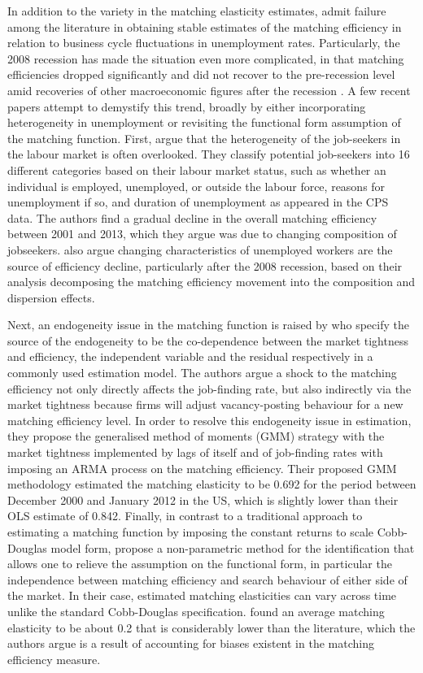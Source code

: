 \documentclass[a4paper, 11pt, tikz]{article}
\begin{document}
In addition to the variety in the matching elasticity estimates, \cite{petrongolo2001looking} admit failure among the literature in obtaining stable estimates of the matching efficiency in relation to business cycle fluctuations in unemployment rates.
Particularly, the 2008 recession has made the situation even more complicated, in that matching efficiencies dropped significantly and did not recover to the pre-recession level amid recoveries of other macroeconomic figures after the recession \citep{barnichon2015labor}.
A few recent papers attempt to demystify this trend, broadly by either incorporating heterogeneity in unemployment or revisiting the functional form assumption of the matching function.
First, \cite{hall2018measuring} argue that the heterogeneity of the job-seekers in the labour market is often overlooked.
They classify potential job-seekers into 16 different categories based on their labour market status, such as whether an individual is employed, unemployed, or outside the labour force, reasons for unemployment if so, and duration of unemployment as appeared in the CPS data.
The authors find a gradual decline in the overall matching efficiency between 2001 and 2013, which they argue was due to changing composition of jobseekers.
\cite{barnichon2015labor} also argue changing characteristics of unemployed workers are the source of efficiency decline, particularly after the 2008 recession, based on their analysis decomposing the matching efficiency movement into the composition and dispersion effects.

Next, an endogeneity issue in the matching function is raised by \cite{borowczyk-martins2013accounting} who specify the source of the endogeneity to be the co-dependence between the market tightness and efficiency, the independent variable and the residual respectively in a commonly used estimation model.
The authors argue a shock to the matching efficiency not only directly affects the job-finding rate, but also indirectly via the market tightness because firms will adjust vacancy-posting behaviour for a new matching efficiency level.
In order to resolve this endogeneity issue in estimation, they propose the generalised method of moments (GMM) strategy with the market tightness implemented by lags of itself and of job-finding rates with imposing an ARMA process on the matching efficiency.
Their proposed GMM methodology estimated the matching elasticity to be 0.692 for the period between December 2000 and January 2012 in the US, which is slightly lower than their OLS estimate of 0.842.
Finally, in contrast to a traditional approach to estimating a matching function by imposing the constant returns to scale Cobb-Douglas model form, \cite{lange2020cobbdouglas} propose a non-parametric method for the identification that allows one to relieve the assumption on the functional form, in particular the independence between matching efficiency and search behaviour of either side of the market.
In their case, estimated matching elasticities can vary across time unlike the standard Cobb-Douglas specification.
\cite{lange2020cobbdouglas} found an average matching elasticity to be about 0.2 that is considerably lower than the literature, which the authors argue is a result of accounting for biases existent in the matching efficiency measure.
\end{document}
